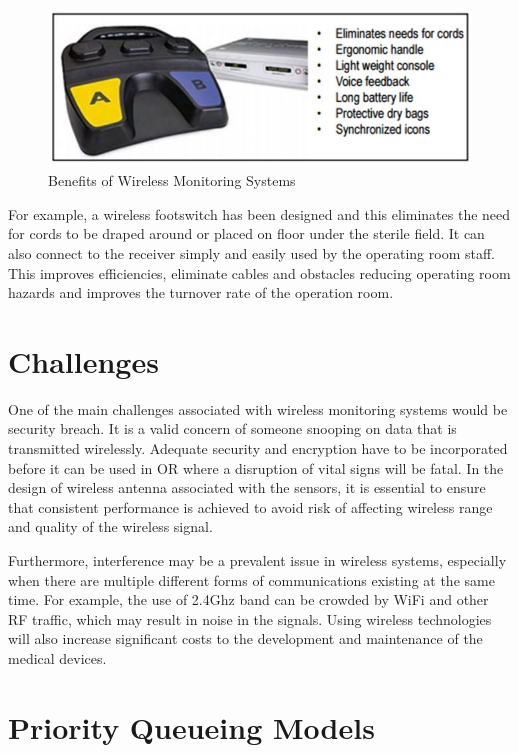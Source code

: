 \begin{figure}[H]
	\centering
	\includegraphics[width=0.7\linewidth]{lit2.jpg}
	\caption{Benefits of Wireless Monitoring Systems \cite{lit1}}
	\label{literaturereview2}
\end{figure}

For example, a wireless footswitch has been designed \cite{lit1} and this eliminates the need for cords to be draped around or placed on floor under the sterile field. It can also connect to the receiver simply and easily used by the operating room staff. This improves efficiencies, eliminate cables and obstacles reducing operating room hazards and improves the turnover rate of the operation room. 

\section{Challenges}

One of the main challenges associated with wireless monitoring systems would be security breach. It is a valid concern of someone snooping on data that is transmitted wirelessly. Adequate security and encryption have to be incorporated before it can be used in OR where a disruption of vital signs will be fatal. In the design of wireless antenna associated with the sensors, it is essential to ensure that consistent performance is achieved to avoid risk of affecting wireless range and quality of the wireless signal.  

Furthermore, interference may be a prevalent issue in wireless systems, especially when there are multiple different forms of communications existing at the same time. For example, the use of 2.4Ghz band can be crowded by WiFi and other RF traffic, which may result in noise in the signals. Using wireless technologies will also increase significant costs to the development and maintenance of the medical devices. 

\section{Priority Queueing Models}

